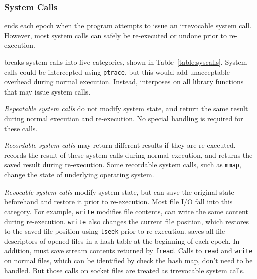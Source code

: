 
\subsubsection*{System Calls}
\label{sec:syscalls}


\doubletake{} ends each epoch when the program attempts to issue an irrevocable system call. However, most system calls can safely be re-executed or undone prior to re-execution. 

\doubletake{} breaks system calls into five categories, shown in Table~\ref{table:syscalls}. System calls could be intercepted using \texttt{ptrace}, but this would add unacceptable overhead during normal execution. Instead, \doubletake{} interposes on all library functions that may issue system calls.


\emph{Repeatable system calls} do not modify system state, and return the same result during normal execution and re-execution. No special handling is required for these calls.




\emph{Recordable system calls} may return different results if they are re-executed. \doubletake{} records the result of these system calls during normal execution, and returns the saved result during re-execution. Some recordable system calls, such as \texttt{mmap}, change the state of underlying operating system. 

\emph{Revocable system calls} modify system state, but \doubletake{} can save the original state beforehand and restore it prior to re-execution. Most file I/O fall into this category. For example, \texttt{write} modifies file contents, \doubletake{} can write the same content during re-execution. \texttt{write} also changes the current file position, which \doubletake{} restores to the saved file position using \texttt{lseek} prior to re-execution. \doubletake{} saves all file descriptors of opened files in a hash table at the beginning of each epoch. In addition, \doubletake{} must save stream contents returned by \texttt{fread}. Calls to \texttt{read} and \texttt{write}  on normal files, which can be identified by check the hash map, don't need to be handled. But those calls on socket files are treated as irrevocable system calls.
	
